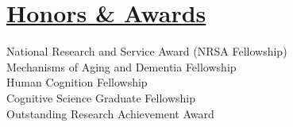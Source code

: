 \documentclass[]{winter-resume-openfont}
\begin{document}
\begin{minipage}[t]{0.3\textwidth}
\section{\underline{Honors \& Awards}}
\sectionsep
\textbullet{}National Research and Service Award (NRSA Fellowship) \\
\textbullet{}Mechanisms of Aging and Dementia Fellowship \\
\textbullet{}Human Cognition Fellowship \\
\textbullet{}Cognitive Science Graduate Fellowship \\
\textbullet{}Outstanding Research Achievement Award \\




\end{minipage} 
\end{document}
